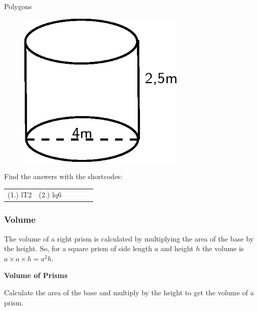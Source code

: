 \begin{exercises}{Polygons}
\begin{enumerate}[noitemsep, label=\textbf{\arabic*}. ]
    \setcounter{subfigure}{0}


	\begin{figure}[H] %
    \begin{center}
    \label{m39357*id62926!!!underscore!!!media}\label{m39357*id62926!!!underscore!!!printimage}\includegraphics[width=300px]{col11306.imgs/m39357_MG10C14_004.png} %
        
      \vspace{2pt}
    \vspace{.1in}
    
    \end{center}

 \end{figure}   

    \addtocounter{footnote}{-0}
            \end{enumerate}
        
        

      
      \label{m39357*uid16}
\par {} Find the answers with the shortcodes:
 \par \begin{tabular}[h]{cccccc}
 (1.) lT2  &  (2.) lq6  & \end{tabular}



            \subsubsection{ Volume}
            \nopagebreak
            \label{m39357*id62951}The volume of a right prism is calculated by multiplying the area of the base by the height. So, for a square prism of side length $a$ and height $h$ the volume is $a\ensuremath{\times}a\ensuremath{\times}h={a}^{2}h$.\par 
        \label{m39357*id63000}
          \textbf{Volume of Prisms}
        \par 
        \label{m39357*id63006}Calculate the area of the base and multiply by the height to get the volume of a prism.\par 
\label{m39357*eip-491}\vspace{.5cm} 
      

\end{exercises}
